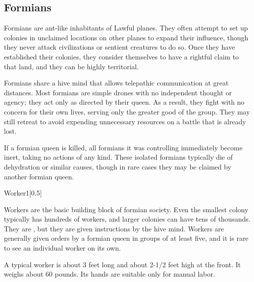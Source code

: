 {{  
  
    \subsection{Formians}
      
    Formians are ant-like inhabitants of Lawful planes.
    They often attempt to set up colonies in unclaimed locations on other planes to expand their influence, though they never attack civilizations or sentient creatures to do so.
    Once they have established their colonies, they consider themselves to have a rightful claim to that land, and they can be highly territorial.

    Formians share a hive mind that allows telepathic communication at great distances.
    Most formians are simple drones with no independent thought or agency; they act only as directed by their queen.
    As a result, they fight with no concern for their own lives, serving only the greater good of the group.
    They may still retreat to avoid expending unnecessary resources on a battle that is already lost.

    If a formian queen is killed, all formians it was controlling immediately become inert, taking no actions of any kind.
    These isolated formians typically die of dehydration or similar causes, though in rare cases they may be claimed by another formian queen.
  

      

      
  \begin{monsubsection}{Worker}{1}[0.5]
    \vspace{-1em}\vspace{-1em}
    \vspace{0em}

    
        Workers are the basic building block of formian society.
        Even the smallest colony typically has hundreds of workers, and larger colonies can have tens of thousands.
        They are , but they are given instructions by the hive mind.
        Workers are generally given orders by a formian queen in groups of at least five, and it is rare to see an individual worker on its own.

        A typical worker is about 3 feet long and about 2-1/2 feet high at the front.
        It weighs about 60 pounds.
        Its hands are suitable only for manual labor.
      
    


\end{monsubsection}}}
